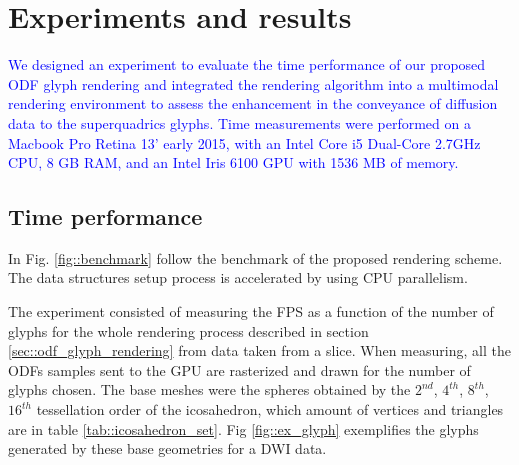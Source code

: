 \documentclass[twoside,twocolumn,10pt]{article}
\begin{document}
\section{Experiments and results}
\label{sec::results}

\textcolor{blue}{We designed an experiment to evaluate the time performance of our proposed ODF glyph rendering and integrated the rendering algorithm into a multimodal rendering environment to assess the enhancement in the conveyance of diffusion data to the superquadrics glyphs. Time measurements were performed on a Macbook Pro Retina 13' early 2015, with an Intel Core i5 Dual-Core 2.7GHz CPU, 8 GB RAM, and an Intel Iris 6100 GPU with 1536 MB of memory.}

\subsection{Time performance}


In Fig. \ref{fig::benchmark} follow the benchmark of the proposed rendering scheme. The data structures setup process is accelerated by using CPU parallelism. 

The experiment consisted of measuring the FPS as a function of the number of glyphs for the whole rendering process described in section \ref{sec::odf_glyph_rendering} from data taken from a slice. When measuring, all the ODFs samples sent to the GPU are rasterized and drawn for the number of glyphs chosen. The base meshes were the spheres obtained by the $2^{nd}$, $4^{th}$, $8^{th}$, $16^{th}$ tessellation order of the icosahedron, which amount of vertices and triangles are in table \ref{tab::icosahedron_set}. Fig \ref{fig::ex_glyph} exemplifies the glyphs generated by these base geometries for a DWI data.
\end{document}
